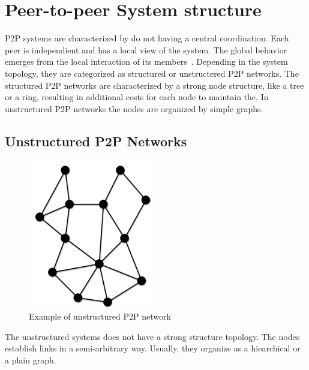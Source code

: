 \section{Peer-to-peer System structure}
\label{sec:p2p_estructure}

P2P systems are characterized by do not having a central coordination. Each
peer is independient and has a local view of the system. The global behavior
emerges from the local interaction of its members~\cite{Aberer:2001:PIS:503271.503268}.
Depending in the system topology, they are categorized as structured or
unstructered P2P networks. The structured P2P networks are characterized by a
strong node structure, like a tree or a ring, resulting in additional costs for
each node to maintain the. In unstructured P2P networks the nodes are organized
by simple graphs.

\subsection{Unstructured P2P Networks}
\label{sec:p2p_unstructured}

\begin{figure}
\center
\includegraphics[width=0.5\textwidth]{img/p2p-unstructured}
\caption{Example of unstructured P2P network}
\label{fig:p2p_unstructured}
\end{figure}

The unstructured systems does not have a strong structure topology. The nodes
establish links in a semi-arbitrary way. Usually, they organize as a hiearchical or a
plain graph.

